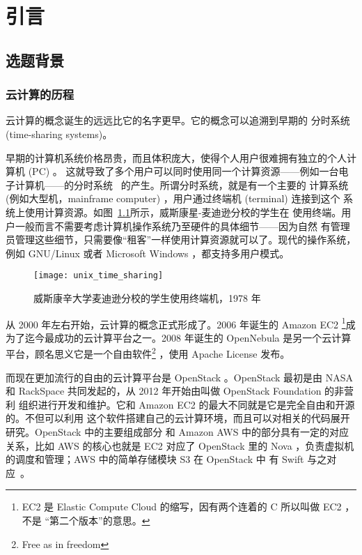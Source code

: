 \chapter{引言}
\label{cha:intro}

\section{选题背景}

\subsection{云计算的历程}
\label{subsec:history-of-cloud}

云计算的概念诞生的远远比它的名字更早。它的概念可以追溯到早期的
分时系统 (time-sharing systems)。

早期的计算机系统价格昂贵，而且体积庞大，使得个人用户很难拥有独立的个人计算机 (PC) 。
这就导致了多个用户可以同时使用同一个计算资源——例如一台电子计算机——的分时系统
~\cite{timesharing}的产生。所谓分时系统，就是有一个主要的
计算系统 (例如大型机，mainframe computer) ，用户通过终端机 (terminal) 连接到这个
系统上使用计算资源。如图~\ref{fig:unix-time-sharing}所示，威斯康星-麦迪逊分校的学生在
使用终端。用户一般而言不需要考虑计算机操作系统乃至硬件的具体细节——因为自然
有管理员管理这些细节，只需要像“租客”一样使用计算资源就可以了。现代的操作系统，
例如 GNU/Linux 或者 Microsoft Windows ，都支持多用户模式。

\begin{figure}[h]
    \centering
    \texttt{[image: unix\_time\_sharing]}
    \caption{威斯康辛大学麦迪逊分校的学生使用终端机，1978 年}
    \label{fig:unix-time-sharing}
\end{figure}

从 2000 年左右开始，云计算的概念正式形成了。2006 年诞生的 Amazon EC2 \footnote{EC2
  是 Elastic Compute Cloud 的缩写，因有两个连着的 C 所以叫做 EC2 ，不是
  “第二个版本”的意思。}成为了迄今最成功的云计算平台之一。2008 年诞生的 OpenNebula
是另一个云计算平台，顾名思义它是一个自由软件\footnote{Free as in freedom}
，使用 Apache License 发布。

而现在更加流行的自由的云计算平台是 OpenStack 。OpenStack 最初是由
 NASA 和 RackSpace 共同发起的，从 2012 年开始由叫做 OpenStack Foundation 的非营利
组织进行开发和维护。它和 Amazon EC2 的最大不同就是它是完全自由和开源的。不但可以利用
这个软件搭建自己的云计算环境，而且可以对相关的代码展开研究。OpenStack 中的主要组成部分
和 Amazon AWS 中的部分具有一定的对应关系，比如 AWS 的核心也就是 EC2 对应了 OpenStack
 里的 Nova ，负责虚拟机的调度和管理；AWS 中的简单存储模块 S3 在 OpenStack 中
有 Swift 与之对应~\cite{openstack}。

